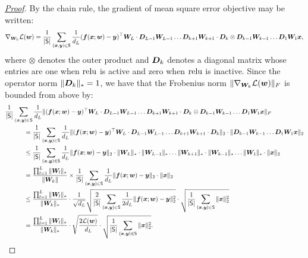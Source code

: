 \gradientbound*
\begin{proof}[\mbox{\hyperref[lem:gradientbound]{Proof}}]\label{proof:gradientbound}
By the chain rule, the gradient of mean square error objective may be written:
\begin{align*}
    \nabla_{{\bm{W}}_k} \mathcal{L}({\bm{w}}) = \frac{1}{\vert {\mathsf{S}} \vert} \sum_{({\bm{x}},{\bm{y}})\in \mathsf{S}}\frac{1}{d_L}({\bm{f}}({\bm{x}};{\bm{w}}) - {\bm{y}})^\top {\bm{W}}_L \cdot {\bm{D}}_{L-1}{\bm{W}}_{L-1} \dots {\bm{D}}_{k+1}{\bm{W}}_{k+1} \cdot {\bm{D}}_{k} \otimes {\bm{D}}_{k-1} {\bm{W}}_{k-1}\dots {\bm{D}}_1 {\bm{W}}_1 {\bm{x}},
\end{align*}
where $\otimes$ denotes the outer product and ${\bm{D}}_k$ denotes a diagonal matrix whose entries are one when $\operatorname{relu}$ is active and zero when $\operatorname{relu}$ is inactive. Since the operator norm $\Vert {{\bm{D}}_k} \Vert_* = 1$, we have that the Frobenius norm $\Vert {\nabla_{{\bm{W}}_k} \mathcal{L}({\bm{w}})} \Vert_F$ is bounded from above by:
\begin{align*}
    &\frac{1}{\abs{\set{S}}} \sum_{(\vx,\vy)\in \set{S}}\frac{1}{d_L}\norm{(\vf(\vx;\vw) - \vy)^\top \mW_L \cdot \mD_{L-1}\mW_{L-1} \dots \mD_{k+1}\mW_{k+1} \cdot \mD_{k} \otimes \mD_{k-1} \mW_{k-1}\dots \mD_1 \mW_1 \vx}_F\\
    &\hspace{3em}= \frac{1}{\abs{\set{S}}} \sum_{(\vx,\vy)\in \set{S}}\frac{1}{d_L}\norm{(\vf(\vx;\vw) - \vy)^\top \mW_L \cdot \mD_{L-1}\mW_{L-1} \dots \mD_{k+1}\mW_{k+1} \cdot \mD_{k}}_2 \cdot \norm{\mD_{k-1} \mW_{k-1}\dots \mD_1 \mW_1 \vx}_2\\
    &\hspace{3em}\leq \frac{1}{\abs{\set{S}}} \sum_{(\vx,\vy)\in \set{S}}\frac{1}{d_L}\norm{\vf(\vx;\vw) - \vy}_2\cdot \norm{\mW_L}_*\cdot \norm{\mW_{L-1}}_* \dots \norm{\mW_{k+1}}_*\cdot \norm{\mW_{k-1}}_*\dots \norm{\mW_1}_*\cdot \norm{\vx}_2 \\
    &\hspace{3em}= \frac{\prod_{l=1}^L\norm{\mW_l}_*}{\norm{\mW_k}} \times \frac{1}{\abs{\set{S}}} \sum_{(\vx,\vy)\in \set{S}}\frac{1}{d_L}\norm{\vf(\vx;\vw) - \vy}_2 \cdot \norm{\vx}_2 \\
    &\hspace{3em}\leq \frac{\prod_{l=1}^L\norm{\mW_l}_*}{\norm{\mW_k}_*} \cdot\frac{1}{\sqrt{d_L}} \sqrt{\frac{2}{\abs{\set{S}}} \sum_{(\vx,\vy)\in \set{S}}\frac{1}{2d_L}\norm{\vf(\vx;\vw) - \vy}_2^2} \cdot \sqrt{\frac{1}{\abs{\set{S}}} \sum_{(\vx,\vy)\in \set{S}}\norm{\vx}_2^2}\\
    &\hspace{3em}= \frac{\prod_{l=1}^L\norm{\mW_l}_*}{\norm{\mW_k}_*} \cdot \sqrt{\frac{2\el(\vw)}{d_L}} \cdot \sqrt{\frac{1}{\abs{\set{S}}} \sum_{(\vx,\vy)\in \set{S}}\norm{\vx}_2^2}.

\end{align*}
\end{proof}
